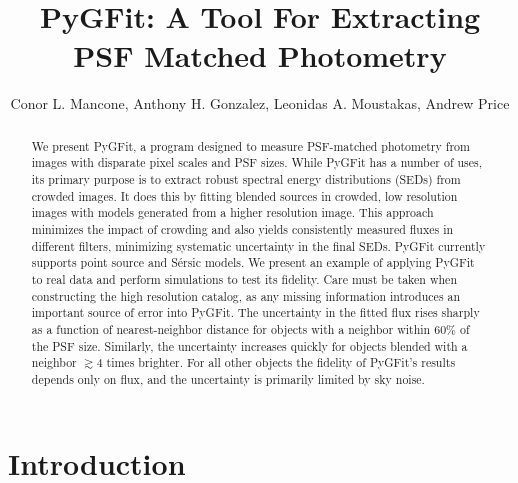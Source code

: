 \documentclass[apj]{emulateapj}
\makeatletter
\newcommand{\myemail}{cmancone@astro.ufl.edu}
\newcommand{\sersic}{S\'{e}rsic}
\newcommand{\pygfit}{PyGFit}
\makeatother
\begin{document}

\title{PyGFit: A Tool For Extracting PSF Matched Photometry}

\author{Conor L. Mancone,
Anthony H. Gonzalez,
Leonidas A. Moustakas,
Andrew Price
}

\email{\myemail}

\begin{abstract}
We present \pygfit{}, a program designed to measure PSF-matched photometry from images with disparate pixel scales and PSF sizes.  While \pygfit{} has a number of uses, its primary purpose is to extract robust spectral energy distributions (SEDs) from crowded images.  It does this by fitting blended sources in crowded, low resolution images with models generated from a higher resolution image.  This approach minimizes the impact of crowding and also yields consistently measured fluxes in different filters, minimizing systematic uncertainty in the final SEDs.  \pygfit{} currently supports point source and \sersic{} models.  We present an example of applying \pygfit{} to real data and perform simulations to test its fidelity.  Care must be taken when constructing the high resolution catalog, as any missing information introduces an important source of error into \pygfit{}.  The uncertainty in the fitted flux rises sharply as a function of nearest-neighbor distance for objects with a neighbor within $60\%$ of the PSF size.  Similarly, the uncertainty increases quickly for objects blended with a neighbor $\gtrsim4$ times brighter.  For all other objects the fidelity of \pygfit{}'s results depends only on flux, and the uncertainty is primarily limited by sky noise.
\end{abstract}

\keywords{}

\section{Introduction}\label{sec:intro}
\end{document}
